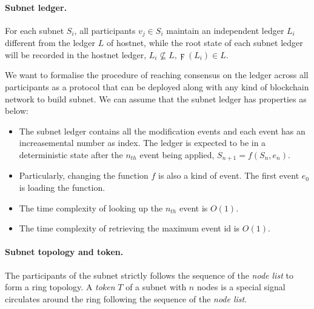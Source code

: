 \documentclass[11pt]{article}
\begin{document}
\paragraph{Subnet ledger.}
For each subnet $S_{i}$, all participants \(v_{j} \in S_{i}\) maintain an independent ledger $L_{i}$ different from the ledger $L$ of hostnet, while the root state of each subnet ledger will be recorded in the hostnet ledger, \( L_{i} \nsubseteq L, \digamma(L_{i}) \in L \).

We want to formalise the procedure of reaching consensus on the ledger across all participants as a protocol that can be deployed along with any kind of blockchain network to build subnet. We can assume that the subnet ledger has properties as below:

\begin{itemize}
\item The subnet ledger contains all the modification events and each event has an increasemental number as index.
The ledger is expected to be in a deterministic state after the $n_{th}$ event being applied, \(S_{n+1} = f(S_{n}, e_{n})\).
\item Particularly, changing the function $f$ is also a kind of event. The first event $e_{0}$ is loading the function.
\item The time complexity of looking up the $n_{th}$ event is $O(1)$.
\item The time complexity of retrieving the maximum event id is $O(1)$.
\end{itemize}

\paragraph{Subnet topology and token.}
The participants of the subnet strictly follows the sequence of the \textit{node list} to form a ring topology.
A \textit{token} $T$ of a subnet with $n$ nodes is a special signal circulates around the ring following the sequence of the \textit{node list}.
\end{document}
